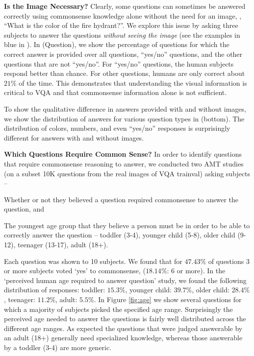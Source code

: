 \textbf{Is the Image Necessary?}
Clearly, some questions can sometimes be
answered correctly using commonsense knowledge alone without the need for an image,
\eg, ``What is the color of the fire hydrant?''.
We explore this issue by asking three subjects to answer
the questions \emph{without seeing the image} (see the examples in blue in ).
In  (Question), we show the percentage of questions for which
the correct answer is provided over all questions, ``yes/no'' questions, and the other questions that
are not ``yes/no''. For ``yes/no'' questions, the human subjects respond better than chance.
For other questions, humans are only correct about $21\%$ of the time. This demonstrates that
understanding the visual information is critical to VQA and that commonsense information alone is not sufficient.

To show the qualitative difference in answers provided with and without images,
we show the distribution of answers for various question types in  (bottom).
The distribution of colors, numbers, and even ``yes/no'' responses is surprisingly different for answers
with and without images.
 
\textbf{Which Questions Require Common Sense?}
In order to identify questions that require commonsense reasoning to answer, we conducted 
two AMT studies (on a subset 10K questions from the real images of VQA trainval) asking subjects --
\begin{compactenum} 
\item Whether or not they believed a question required commonsense to answer the question, and 
\item The youngest age group that they believe a person must be in order to be able to correctly answer the question -- 
toddler (3-4), 
younger child (5-8), 
older child (9-12), 
teenager (13-17), 
adult (18+).
\end{compactenum}
Each question was shown to 10 subjects. We found that 
for $47.43\%$ of questions 3 or more subjects voted `yes' to commonsense, 
($18.14\%$: 6 or more).  
In the `perceived human age required to answer question' study, we found the following distribution of responses: 
toddler: $15.3\%$,
younger child: $39.7\%$, 
older child: $28.4\%$, 
teenager: $11.2\%$, 
adult: $5.5\%$.
In Figure \ref{fig:age} we show several questions for which a majority of subjects picked the specified age range. Surprisingly the perceived age needed to answer the questions is fairly well distributed across the different age ranges. As expected the questions that were judged answerable by an adult (18+) generally need specialized knowledge, whereas those answerable by a toddler (3-4) are more generic.
 
